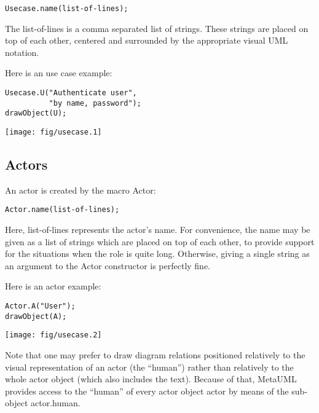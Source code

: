 \documentclass{article}
\newcommand{\code}{\ttfamily}
\begin{document}
\begin{verbatim}
Usecase.name(list-of-lines);
\end{verbatim}

The {\code list-of-lines} is a comma separated list of strings. These strings are placed
on top of each other, centered and surrounded by the appropriate visual UML notation.

Here is an use case example:

\begin{multicols}{2}
\begin{verbatim}
Usecase.U("Authenticate user",
          "by name, password");
drawObject(U);
\end{verbatim}
\columnbreak
\hspace{1cm}\texttt{[image: fig/usecase.1]}
\end{multicols}

\subsection{Actors}

An actor is created by the macro {\code Actor}:

\begin{verbatim}
Actor.name(list-of-lines);
\end{verbatim}

Here, {\code list-of-lines} represents the actor's name. For convenience, the name may be
given as a list of strings which are placed on top of each other, to provide support for
the situations when the role is quite long. Otherwise, giving a single string
as an argument to the Actor constructor is perfectly fine.

Here is an actor example:

\begin{multicols}{2}
\begin{verbatim}
Actor.A("User");
drawObject(A);
\end{verbatim}
\columnbreak
\hspace{1cm}\texttt{[image: fig/usecase.2]}
\end{multicols}

Note that one may prefer to draw diagram relations positioned relatively to
the visual representation of an actor (the ``human'') rather than relatively to the whole
actor object (which also includes the text). Because of that, MetaUML provides access
to the ``human'' of every actor object {\code actor} by means of the sub-object {\code actor.human}.
\end{document}
